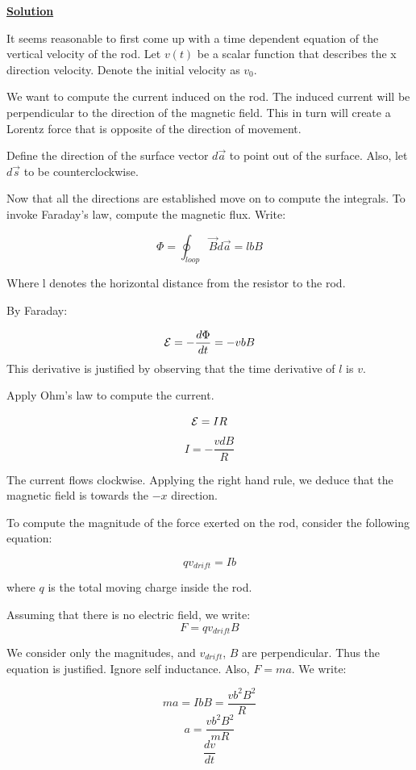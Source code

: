 \documentclass{article}
\newcommand{\new}[1]{
    \vspace{2mm}
    \noindent
    \textbf{
    \underline{#1}}
}
\begin{document}
\new{Solution}
It seems reasonable to first come up 
with a time dependent equation of
the vertical velocity of the rod. Let 
$v(t)$ be a scalar function that describes 
the x direction velocity. Denote the initial 
velocity as $v_0$. 

We want to compute the current induced 
on the rod. The induced current 
will be perpendicular to the direction of 
the magnetic field. This in turn will 
create a Lorentz force that is opposite 
of the direction of movement. 

Define the direction of the surface vector 
$d\vec{a}$ to point out of the surface. 
Also, let $d\vec{s}$ to be counterclockwise. 

Now that all the directions are established 
move on to compute the integrals. To 
invoke Faraday's law, compute the magnetic 
flux. Write:

\[
    \Phi = \oint_{loop} \vec{B}d\vec{a}
     = lbB
\]

Where l denotes the horizontal distance 
from the resistor to the rod. 

By Faraday:

\[
    {\mathcal{E}} = 
    -\frac{d\Phi}{dt}
     = -vbB
\]
This derivative is justified by observing 
that the time derivative of $l$ is $v$. 

Apply Ohm's law to compute the current. 

\[
    {\mathcal{E}} = I R
\]
\[
    I = -\frac{vdB}{R}
\]

The current flows clockwise. 
Applying the right hand rule, 
we deduce that the magnetic field 
is towards the $-x$ direction. 

To compute the magnitude of the 
force exerted on the rod, consider
the following equation:

\[
    qv_{drift} = Ib
\]

where $q$ is the total moving charge 
inside the rod. 

Assuming that there is no electric field, 
we write:
\[
    F = qv_{drift}B
\]

We consider only the magnitudes, and 
$v_{drift}$, $B$ are perpendicular. Thus 
the equation is justified. Ignore self 
inductance. Also, $F = ma$. We write:

\[
    ma = IbB = \frac{vb^2B^2}{R}
\]
\[
    a = \frac{vb^2B^2}{mR}
\]
\[
    \frac{dv}{dt}
\]
\end{document}
